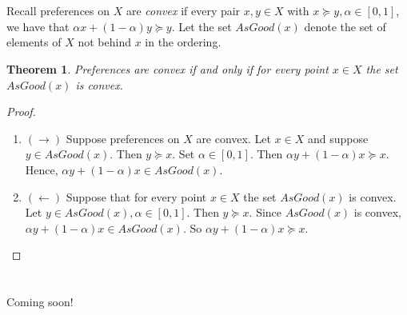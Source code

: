 \documentclass[12pt]{article}
\newtheorem{thm}{Theorem}[section]
\theoremstyle{definition}
\theoremstyle{remark}
\begin{document}
\section{}
Recall preferences on $X$ are \emph{convex} if every pair $x,y \in X$ with $x \succeq y, \alpha \in [0,1]$, we have that $\alpha x + (1-\alpha)y \succeq y$. Let the set $AsGood(x)$ denote the set of elements of $X$ not behind $x$ in the ordering.
\begin{thm}
  Preferences are convex if and only if for every point $x \in X$ the set $AsGood(x)$ is convex.
\end{thm}
\begin{proof}
  \begin{enumerate}
    \item $(\rightarrow)$ Suppose preferences on $X$ are convex. Let $x \in X$ and suppose $y \in AsGood(x)$. Then $y \succeq x$. Set $\alpha \in [0,1]$. Then $\alpha y + (1-\alpha)x \succeq x$. Hence, $\alpha y + (1-\alpha)x \in AsGood(x)$.
    \item $(\leftarrow)$ Suppose that for every point $x \in X$ the set $AsGood(x)$ is convex. Let $y \in AsGood(x), \alpha \in [0,1]$. Then $y \succeq x$. Since $AsGood(x)$ is convex, $\alpha y + (1-\alpha)x \in AsGood(x)$. So $\alpha y + (1-\alpha)x \succeq x$.
  \end{enumerate}
\end{proof}
%
%
\section{}
Coming soon!
%
%
\end{document}
